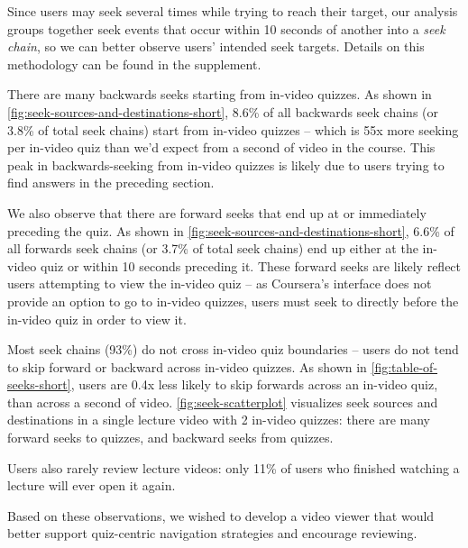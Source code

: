 \documentclass{sigchi}
\begin{document}
Since users may seek several times while trying to reach their target, our analysis groups together seek events that occur within 10 seconds of another into a \textit{seek chain}, so we can better observe users' intended seek targets. Details on this methodology can be found in the supplement.


There are many backwards seeks starting from in-video quizzes. As shown in \autoref{fig:seek-sources-and-destinations-short}, 8.6\% of all backwards seek chains (or 3.8\% of total seek chains) start from in-video quizzes -- which is 55x more seeking per in-video quiz than we'd expect from a second of video in the course. This peak in backwards-seeking from in-video quizzes is likely due to users trying to find answers in the preceding section.

We also observe that there are forward seeks that end up at or immediately preceding the quiz. As shown in \autoref{fig:seek-sources-and-destinations-short}, 6.6\% of all forwards seek chains (or 3.7\% of total seek chains) end up either at the in-video quiz or within 10 seconds preceding it. These forward seeks are likely reflect users attempting to view the in-video quiz -- as Coursera's interface does not provide an option to go to in-video quizzes, users must seek to directly before the in-video quiz in order to view it.

Most seek chains (93\%) do not cross in-video quiz boundaries -- users do not tend to skip forward or backward across in-video quizzes. As shown in \autoref{fig:table-of-seeks-short}, users are 0.4x less likely to skip forwards across an in-video quiz, than across a second of video. \autoref{fig:seek-scatterplot} visualizes seek sources and destinations in a single lecture video with 2 in-video quizzes: there are many forward seeks to quizzes, and backward seeks from quizzes.

Users also rarely review lecture videos: only 11\% of users who finished watching a lecture will ever open it again.

Based on these observations, we wished to develop a video viewer that would better support quiz-centric navigation strategies and encourage reviewing.


\end{document}

